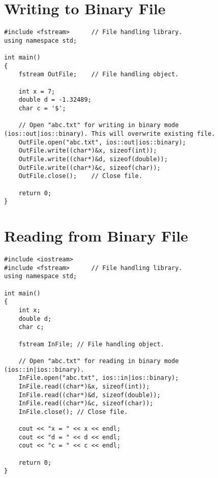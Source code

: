 \documentclass[12pt,a4paper]{article}
\begin{document}
\section{Writing to Binary File}
\begin{lstlisting}[caption={Writing to binary file}]
#include <fstream>		// File handling library.
using namespace std;

int main()
{
	fstream OutFile;	// File handling object.

	int x = 7;
	double d = -1.32489;
	char c = '$';

	// Open "abc.txt" for writing in binary mode (ios::out|ios::binary). This will overwrite existing file.
	OutFile.open("abc.txt", ios::out|ios::binary);
	OutFile.write((char*)&x, sizeof(int));
	OutFile.write((char*)&d, sizeof(double));
	OutFile.write((char*)&c, sizeof(char));
	OutFile.close();	// Close file.

	return 0;
}
\end{lstlisting}
\section{Reading from Binary File}
\begin{lstlisting}[caption={Reading from Binary file}]
#include <iostream>
#include <fstream>		// File handling library.
using namespace std;

int main()
{
	int x;
	double d;
	char c;

	fstream InFile;	// File handling object.

	// Open "abc.txt" for reading in binary mode (ios::in|ios::binary).
	InFile.open("abc.txt", ios::in|ios::binary);
	InFile.read((char*)&x, sizeof(int));
	InFile.read((char*)&d, sizeof(double));
	InFile.read((char*)&c, sizeof(char));
	InFile.close();	// Close file.

	cout << "x = " << x << endl;
	cout << "d = " << d << endl;
	cout << "c = " << c << endl;

	return 0;
}
\end{lstlisting}
\end{document}
